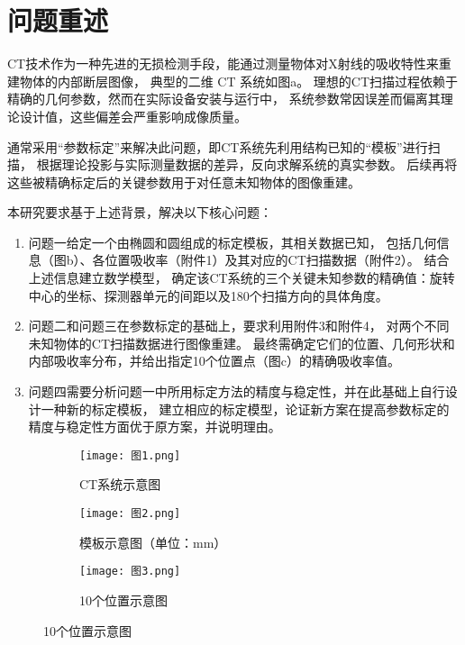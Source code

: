 \section{\heiti 问题重述}
CT技术作为一种先进的无损检测手段，能通过测量物体对X射线的吸收特性来重建物体的内部断层图像，
典型的二维 CT 系统如图a。
理想的CT扫描过程依赖于精确的几何参数，然而在实际设备安装与运行中，
系统参数常因误差而偏离其理论设计值，这些偏差会严重影响成像质量。
\par
通常采用“参数标定”来解决此问题，即CT系统先利用结构已知的“模板”进行扫描，
根据理论投影与实际测量数据的差异，反向求解系统的真实参数。
后续再将这些被精确标定后的关键参数用于对任意未知物体的图像重建。
\par
本研究要求基于上述背景，解决以下核心问题：

\begin{enumerate}[label=(\arabic*), left=0.5em]
    \item 问题一给定一个由椭圆和圆组成的标定模板，其相关数据已知，
    包括几何信息（图b）、各位置吸收率（附件1）及其对应的CT扫描数据（附件2）。
    结合上述信息建立数学模型，
    确定该CT系统的三个关键未知参数的精确值：旋转中心的坐标、探测器单元的间距以及180个扫描方向的具体角度。
    \item 问题二和问题三在参数标定的基础上，要求利用附件3和附件4，
    对两个不同未知物体的CT扫描数据进行图像重建。
    最终需确定它们的位置、几何形状和内部吸收率分布，并给出指定10个位置点（图c）的精确吸收率值。
    \item 问题四需要分析问题一中所用标定方法的精度与稳定性，并在此基础上自行设计一种新的标定模板，
    建立相应的标定模型，论证新方案在提高参数标定的精度与稳定性方面优于原方案，并说明理由。
\end{enumerate}

\begin{figure}[htbp]
    \centering 

    \begin{subfigure}{0.3\textwidth}
        \centering
        \texttt{[image: 图1.png]}
        \caption{CT系统示意图}
        \label{fig:p1}
    \end{subfigure}
    \hfill 
    \begin{subfigure}{0.3\textwidth}
        \centering
        \texttt{[image: 图2.png]}
        \caption{模板示意图（单位：mm）}
        \label{fig:p2}
    \end{subfigure}
    \hfill 
    \begin{subfigure}{0.3\textwidth}
        \centering
        \texttt{[image: 图3.png]}
        \caption{10个位置示意图}
        \label{fig:p3}
    \end{subfigure}

\end{figure}


